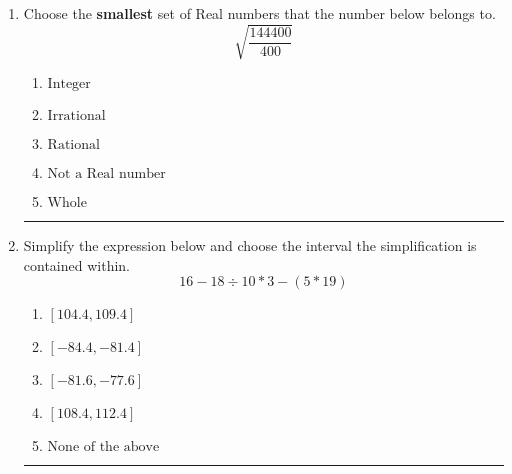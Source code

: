 \documentclass[14pt]{extbook}
\newcommand{\litem}[1]{\item#1\hspace*{-1cm}\rule{\textwidth}{0.4pt}}
\begin{document}
\begin{enumerate}
{\begin{enumerate}[label=\Alph*.]
\end{enumerate} }
\litem{
Choose the \textbf{smallest} set of Real numbers that the number below belongs to.\[ \sqrt{\frac{144400}{400}} \]\begin{enumerate}[label=\Alph*.]
\item \( \text{Integer} \)
\item \( \text{Irrational} \)
\item \( \text{Rational} \)
\item \( \text{Not a Real number} \)
\item \( \text{Whole} \)

\end{enumerate} }
\litem{
Simplify the expression below and choose the interval the simplification is contained within.\[ 16 - 18 \div 10 * 3 - (5 * 19) \]\begin{enumerate}[label=\Alph*.]
\item \( [104.4, 109.4] \)
\item \( [-84.4, -81.4] \)
\item \( [-81.6, -77.6] \)
\item \( [108.4, 112.4] \)
\item \( \text{None of the above} \)

\end{enumerate} }
\end{enumerate}
\end{document}
